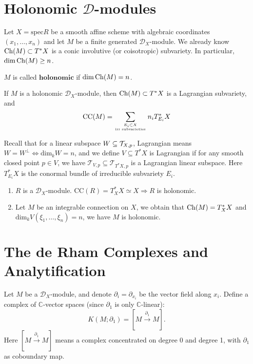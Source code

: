 \section{Holonomic $\mathcal{D}$-modules}
Let $X = \text{spec} R$ be a smooth affine scheme with algebraic coordinates $(x_1, \ldots, x_n)$ and let $M$ be a finite generated $\mathcal{D}_X$-module. We already know $\operatorname{Ch}(M) \subset T^*X$ is a conic involutive (or coisotropic) subvariety. In particular, $\dim \operatorname{Ch}(M) \geq n$.

\begin{definition}
    $M$ is called $\textbf{holonomic}$ if $\dim \operatorname{Ch}(M) = n$.
\end{definition}

\begin{corollary}
    If $M$ is a holonomic $\mathcal{D}_X$-module, then $\operatorname{Ch}(M) \subset T^*X$ is a Lagrangian subvariety, and $$\mathrm{CC}(M) = \sum_{E_i \subset X\atop \text{irr subvarieties}} n_i T^*_{E_i} X$$
\end{corollary}

\begin{remark}
    Recall that for a linear subspace $W \subseteq \mathcal{T}_{X,p}$, Lagrangian means $W=W^{\perp}\iff \mathrm{dim}_{k}W=n$, and we define $V\subseteq T^{\ast}X$ is Lagrangian if for any smooth closed point $p\in V$, we have $\mathcal{T}_{V,p}\subseteq \mathcal{T}_{T^{\ast}X,p}$ is a Lagrangian linear subspace. Here $T^{\ast}_{E_{i}}X$ is the conormal bundle of irreducible subvariety $E_{i}$.
\end{remark}

\begin{example}
    \quad
    \begin{enumerate}
        \item $R$ is a $\mathcal{D}_X$-module. $\mathrm{CC}(R) = T^*_X X\simeq X \Rightarrow R$ is holonomic.
        \item Let $M$ be an integrable connection on $X$, we obtain that $\operatorname{Ch}(M)=T^{\ast}_{X}X$ and $\mathrm{dim}_{k}V(\xi_{1},\dots,\xi_{n})=n$, we have $M$ is holonomic.
    \end{enumerate}
\end{example}

\section{The de Rham Complexes and Analytification}

Let $M$ be a $\mathcal{D}_X$-module, and denote $\partial_i = \partial_{x_i}$ be the vector field along $x_i$.
Define a complex of $\mathbb{C}$-vector spaces (since $\partial_1$ is only $\mathbb{C}$-linear): $$K(M; \partial_1) = [M \xrightarrow{\partial_1} M].$$Here $[M\xrightarrow{\partial_{1}} M]$ means a complex concentrated on degree 0 and degree 1, with $\partial_{1}$ as coboundary map.

